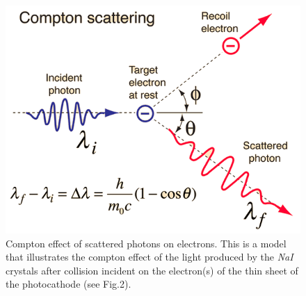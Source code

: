 \documentclass[%
 reprint,
 amsmath,amssymb,
 aps,
]{revtex4-1}
\begin{document}
\begin{figure}[ht]
\includegraphics[width = .5\textwidth ,frame]{Compton.png}
\caption{  Compton effect of scattered photons on electrons\cite{HP}. This is a model that illustrates the compton effect of the  light produced by the \textit{NaI} crystals after \gp collision incident on the electron(s) of the thin sheet of the photocathode (see Fig.2).  }
\end{figure}
\end{document}
